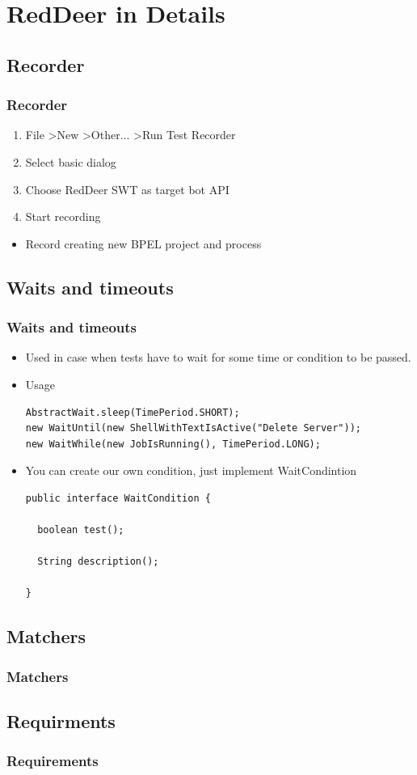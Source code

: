 \documentclass{beamer}
\begin{document}
\section{RedDeer in Details}

\subsection{Recorder}
\begin{frame}[fragile]
\frametitle{Recorder}
\begin{enumerate}
\item File \textgreater New \textgreater Other... \textgreater Run Test Recorder
\item Select basic dialog
\item Choose RedDeer SWT as target bot API
\item Start recording
\end{enumerate}
\begin{itemize}
\item Record creating new BPEL project and process
\end{itemize}

\end{frame}

\subsection{Waits and timeouts}
\begin{frame}[fragile]
\frametitle{Waits and timeouts}
\begin{itemize}
\item Used in case when tests have to wait for some time or condition to be passed.
\item Usage
\begin{lstlisting}
AbstractWait.sleep(TimePeriod.SHORT);
new WaitUntil(new ShellWithTextIsActive("Delete Server"));
new WaitWhile(new JobIsRunning(), TimePeriod.LONG);
\end{lstlisting}
\item You can create our own condition, just implement WaitCondintion
\begin{lstlisting}
public interface WaitCondition {

  boolean test();

  String description();

}
\end{lstlisting}
\end{itemize}
\end{frame}

\subsection{Matchers}
\begin{frame}[fragile]
\frametitle{Matchers}
\end{frame}

\subsection{Requirments}
\begin{frame}[fragile]
\frametitle{Requirements}
\end{frame}
\end{document}
